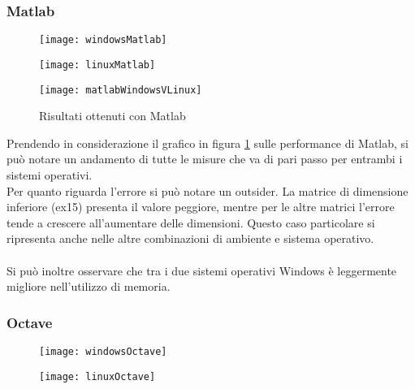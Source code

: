 \subsubsection{Matlab}
\begin{figure}[H]
    \centering
    \begin{minipage}{0.45\textwidth}
        \centering
        \texttt{[image: windowsMatlab]}
    \end{minipage}
    \begin{minipage}{0.45\textwidth}
        \centering
        \texttt{[image: linuxMatlab]}
    \end{minipage}
\end{figure}


\begin{figure}[H]
\texttt{[image: matlabWindowsVLinux]}\centering
\caption{Risultati ottenuti con Matlab}\label{fig:matlab}
\end{figure}
Prendendo in considerazione il grafico in figura \ref{fig:matlab} sulle performance di Matlab, si può notare un andamento di tutte le misure che va di pari passo per entrambi i sistemi operativi. \\
Per quanto riguarda l'errore si può notare un outsider. La matrice di dimensione inferiore (ex15) presenta il valore peggiore, mentre per le altre matrici l'errore tende a crescere all'aumentare delle dimensioni. Questo caso particolare si ripresenta anche nelle altre combinazioni di ambiente e sistema operativo.
\\\\
Si può inoltre osservare che tra i due sistemi operativi Windows è leggermente migliore nell'utilizzo di memoria.

\subsubsection{Octave}

\begin{figure}[H]
    \centering
    \begin{minipage}{0.45\textwidth}
        \centering
        \texttt{[image: windowsOctave]}
    \end{minipage}
    \begin{minipage}{0.45\textwidth}
        \centering
        \texttt{[image: linuxOctave]}
    \end{minipage}
\end{figure}

